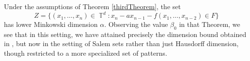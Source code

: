 \documentclass[dvipsnames,letterpaper,12pt]{article}
\numberwithin{equation}{section}
\DeclareMathOperator{\QQ}{\mathbb{Q}}
\DeclareMathOperator{\TT}{\mathbb{T}}
\numberwithin{theorem}{section}
\begin{document}
Under the assumptions of Theorem \ref{thirdTheorem}, the set
%
\[ Z = \{ (x_1,\dots,x_n) \in \TT^d: x_n - ax_{n-1} - f(x_1,\dots,x_{n-2}) \in F \} \]
%
has lower Minkowski dimension $\alpha$. Observing the value $\beta_0$ in that Theorem, we see that in this setting, we have attained precisely the dimension bound obtained in \cite{OurPaper}, but now in the setting of Salem sets rather than just Hausdorff dimension, though restricted to a more specialized set of patterns.

%
%
%
%
\end{document}
